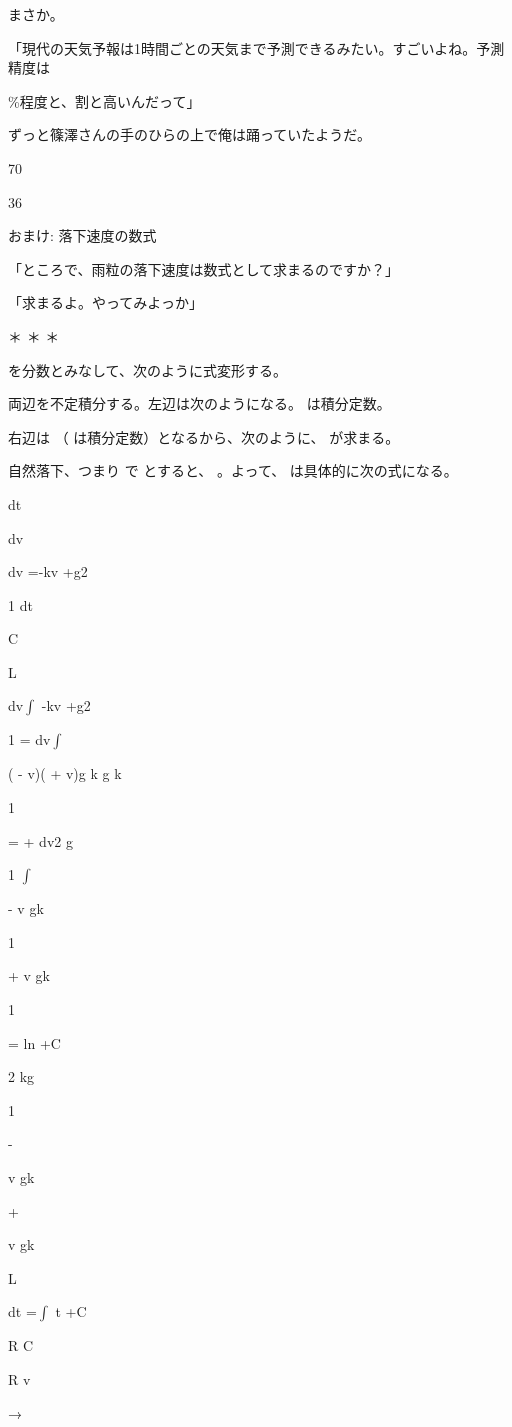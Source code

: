 まさか。\par
「現代の天気予報は1時間ごとの天気まで予測できるみたい。すごいよね。予測精度は\par
\%程度と、割と⾼いんだって」\par
ずっと篠澤さんの⼿のひらの上で俺は踊っていたようだ。\par
70\par
36\par

おまけ: 落下速度の数式\par
「ところで、⾬粒の落下速度は数式として求まるのですか？」\par
「求まるよ。やってみよっか」\par
＊ ＊ ＊\par
を分数とみなして、次のように式変形する。\par
両辺を不定積分する。左辺は次のようになる。 は積分定数。\par
右辺は （ は積分定数）となるから、次のように、 が求まる。\par
⾃然落下、つまり で とすると、 。よって、 は具体的に次の式になる。\par
dt\par
dv\par
dv =-kv +g2\par
1 dt\par
C\par
L\par
dv$\int$ -kv +g2\par
1 =  dv$\int$\par
(  -  v)(  +  v)g k g k\par
1\par
=  +  dv2 g\par
1 $\int$\par
-  v gk\par
1\par
+  v gk\par
1\par
=  ln    +C\par
2  kg\par
1\par
-\par
v gk\par
+\par
v gk\par
L\par
dt =$\int$ t +C\par
R C\par
R v\par
→\par
